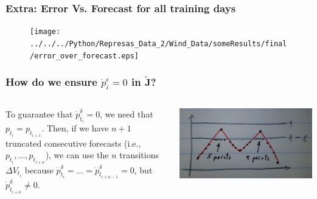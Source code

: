 \documentclass[aspectratio=169]{beamer}\usepackage[utf8]{inputenc}
\begin{document}
\begin{frame}\frametitle{Extra: Error Vs. Forecast for all training days}

\begin{figure}[ht!]
\centering
\texttt{[image: ../../../Python/Represas\_Data\_2/Wind\_Data/someResults/final/error\_over\_forecast.eps]}
\end{figure}

\end{frame}


\begin{frame}\frametitle{How do we ensure $\dot{p}^\epsilon_i=0$ in $\tilde{\mathbf{J}}$?}

\begin{columns}


To guarantee that $\dot{p}^\delta_{t_i}=0$, we need that $p_{t_i}=p_{t_{i+1}}$. Then, if we have $n+1$ truncated consecutive forecasts (i.e., $p_{t_i},\dots,p_{t_{i+n}}$), we can use the $n$ transitions $\Delta V_{t_i}$ because $\dot{p}^\delta_{t_{i}}=\dots=\dot{p}^\delta_{t_{i+n-1}}=0$, but $\dot{p}^\delta_{t_{i+n}}\neq0$.

\includegraphics[width=0.9\columnwidth]{2.jpg}

\end{columns}

\end{frame}
\end{document}
